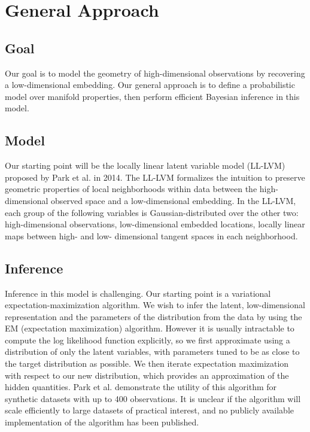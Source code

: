 \documentclass{article}
\begin{document}
\section{General Approach}
\subsection{Goal}
Our goal is to model the geometry of high-dimensional observations by recovering a low-dimensional embedding. Our general approach is to define a probabilistic model over manifold properties, then perform efficient Bayesian inference in this model.
\subsection{Model}
Our starting point will be the locally linear latent variable model (LL-LVM) proposed by Park et al. in 2014. The LL-LVM formalizes the intuition to preserve geometric properties of local neighborhoods within data between the high-dimensional observed space and a low-dimensional embedding. In the LL-LVM, each group of the following variables is Gaussian-distributed over the other two: high-dimensional observations, low-dimensional embedded locations, locally linear maps between high- and low- dimensional tangent spaces in each neighborhood.
\subsection{Inference}
Inference in this model is challenging. Our starting point is a variational expectation-maximization algorithm. We wish to infer the latent, low-dimensional representation and the parameters of the distribution from the data by using the EM (expectation maximization) algorithm. However it is usually intractable to compute the log likelihood function explicitly, so we first approximate using a distribution of only the latent variables, with parameters tuned to be as close to the target distribution as possible. We then iterate expectation maximization with respect to  our new distribution, which provides an approximation of the hidden quantities. Park et al. demonstrate the utility of this algorithm for synthetic datasets with up to 400 observations. It is unclear if the algorithm will scale efficiently to large datasets of practical interest, and no publicly available implementation of the algorithm has been published.
\end{document}
